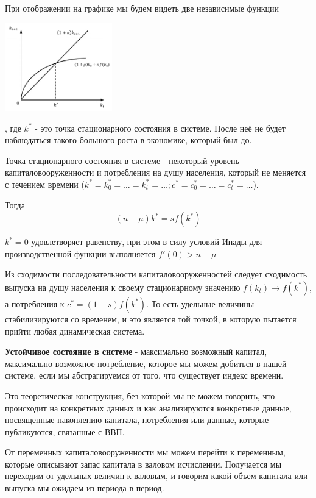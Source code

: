 \documentclass[reqno]{article}
\theoremstyle{definition}
\theoremstyle{definition}
\theoremstyle{definition}
\theoremstyle{definition}
\theoremstyle{definition}
\theoremstyle{definition}
\theoremstyle{definition}
\theoremstyle{definition}
\theoremstyle{definition}
\begin{document}
		При отображении на графике мы будем видеть две независимые функции
		
		\begin{center}
			\includegraphics[width=0.35\textwidth]{Cтационарное_состояние_Солоу}
		\end{center}
		
		, где $k^*$ - это  точка стационарного состояния в системе. После неё не будет наблюдаться такого большого роста в экономике, который был до.
		
		Точка стационарного состояния в системе - некоторый уровень капиталовооруженности и потребления на душу населения, который не меняется с течением времени ($k^* = k_0^* = \dots = k_t^* = \dots; c^* = c_0^* = \dots = c_t^* = \dots$). 
		
		Тогда $$(n + \mu) k^* = s f(k^*)$$
		
		$k^*=0$ удовлетворяет равенству, при этом в силу условий Инады для производственной функции выполняется $f'(0) > n + \mu$
		
		Из сходимости последовательности капиталовооруженностей следует сходимость выпуска на душу населения к своему стационарному значению $f(k_t) \rightarrow f(k^*)$, а потребления к $c^* = (1-s)f(k^*)$. То есть удельные величины стабилизируются со временем, и это является той точкой, в которую пытается прийти любая динамическая система. 
		
		\textbf{Устойчивое состояние в системе} - максимально возможный капитал, максимально возможное потребление, которое мы можем добиться в нашей системе, если мы абстрагируемся от того, что существует индекс времени.
		
		Это теоретическая конструкция, без которой мы не можем говорить, что происходит на конкретных данных и как анализируются конкретные данные, посвященные накоплению капитала, потребления или данные, которые публикуются, связанные с ВВП.\bigskip
		
		От переменных капиталовооруженности мы можем перейти к переменным, которые описывают запас капитала в валовом исчислении. Получается мы переходим от удельных величин к валовым, и говорим какой объем капитала или выпуска мы ожидаем из периода в период. 
		
\end{document}
